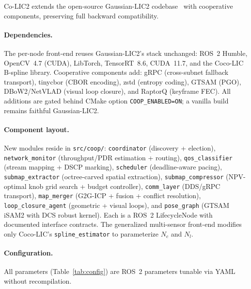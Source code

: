 \label{sec:implementation}

Co-LIC2 extends the open-source Gaussian-LIC2 codebase~\cite{lang2026gaussian2}
with cooperative components, preserving full backward compatibility.

\paragraph{Dependencies.} The per-node front-end reuses Gaussian-LIC2's stack
unchanged: ROS~2 Humble, OpenCV~4.7 (CUDA), LibTorch, TensorRT~8.6, CUDA~11.7,
and the Coco-LIC B-spline library. Cooperative components add: gRPC
(cross-subnet fallback transport), tinycbor (CBOR encoding), zstd (entropy
coding), GTSAM (PGO), DBoW2/NetVLAD (visual loop closure), and RaptorQ
(keyframe FEC). All additions are gated behind CMake option
\texttt{COOP\_ENABLED=ON}; a vanilla build remains faithful Gaussian-LIC2.

\paragraph{Component layout.} New modules reside in \texttt{src/coop/}:
\texttt{coordinator} (discovery + election), \texttt{network\_monitor}
(throughput/PDR estimation + routing), \texttt{qos\_classifier} (stream mapping
+ DSCP marking), \texttt{scheduler} (deadline-aware pacing),
\texttt{submap\_extractor} (octree-carved spatial extraction),
\texttt{submap\_compressor} (NPV-optimal knob grid search + budget
controller), \texttt{comm\_layer} (DDS/gRPC transport),
\texttt{map\_merger} (G2G-ICP + fusion + conflict resolution),
\texttt{loop\_closure\_agent} (geometric + visual loops), and
\texttt{pose\_graph} (GTSAM iSAM2 with DCS robust kernel). Each is a ROS~2
LifecycleNode with documented interface contracts. The generalized multi-sensor
front-end modifies only Coco-LIC's \texttt{spline\_estimator} to parameterize
$N_c$ and $N_l$.

\paragraph{Configuration.} All parameters (Table~\ref{tab:config}) are ROS~2
parameters tunable via YAML without recompilation.

